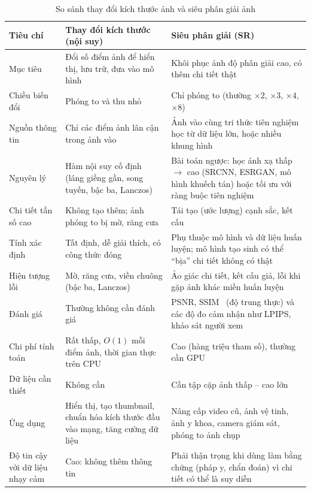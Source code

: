 \begin{table}[ht]
\centering
\scriptsize
\caption{So sánh thay đổi kích thước ảnh và siêu phân giải ảnh}
\label{tab:w6_resize_sr}
\renewcommand{\arraystretch}{1.3}
\begin{tabularx}{\textwidth}{|p{2.3cm}|X|X|}
\hline
\textbf{Tiêu chí} & \textbf{Thay đổi kích thước (nội suy)} & \textbf{Siêu phân giải (SR)} \\
\hline
Mục tiêu & Đổi số điểm ảnh để hiển thị, lưu trữ, đưa vào mô hình & Khôi phục ảnh độ phân giải cao, có thêm chi tiết thật \\
\hline
Chiều biến đổi & Phóng to và thu nhỏ & Chỉ phóng to (thường $\times 2$, $\times 3$, $\times 4$, $\times 8$) \\
\hline
Nguồn thông tin & Chỉ các điểm ảnh lân cận trong ảnh vào & Ảnh vào cùng tri thức tiên nghiệm học từ dữ liệu lớn, hoặc nhiều khung hình \\
\hline
Nguyên lý & Hàm nội suy cố định (láng giềng gần, song tuyến, bậc ba, Lanczos) & Bài toán ngược: học ánh xạ thấp $\to$ cao (SRCNN, ESRGAN, mô hình khuếch tán) hoặc tối ưu với ràng buộc tiên nghiệm \\
\hline
Chi tiết tần số cao & Không tạo thêm; ảnh phóng to bị mờ, răng cưa & Tái tạo (ước lượng) cạnh sắc, kết cấu \\
\hline
Tính xác định & Tất định, dễ giải thích, có công thức đóng & Phụ thuộc mô hình và dữ liệu huấn luyện; mô hình tạo sinh có thể ``bịa'' chi tiết không có thật \\
\hline
Hiện tượng lỗi & Mờ, răng cưa, viền chuông (bậc ba, Lanczos) & Ảo giác chi tiết, kết cấu giả, lỗi khi gặp ảnh khác miền huấn luyện \\
\hline
Đánh giá & Thường không cần đánh giá & PSNR, SSIM~\citep{wang2004image} (độ trung thực) và các độ đo cảm nhận như LPIPS, khảo sát người xem \\
\hline
Chi phí tính toán & Rất thấp, $O(1)$ mỗi điểm ảnh, thời gian thực trên CPU & Cao (hàng triệu tham số), thường cần GPU \\
\hline
Dữ liệu cần thiết & Không cần & Cần tập cặp ảnh thấp -- cao lớn \\
\hline
Ứng dụng & Hiển thị, tạo thumbnail, chuẩn hóa kích thước đầu vào mạng, tăng cường dữ liệu & Nâng cấp video cũ, ảnh vệ tinh, ảnh y khoa, camera giám sát, phóng to ảnh chụp \\
\hline
Độ tin cậy với dữ liệu nhạy cảm & Cao: không thêm thông tin & Phải thận trọng khi dùng làm bằng chứng (pháp y, chẩn đoán) vì chi tiết có thể là suy diễn \\
\hline
\end{tabularx}
\end{table}

